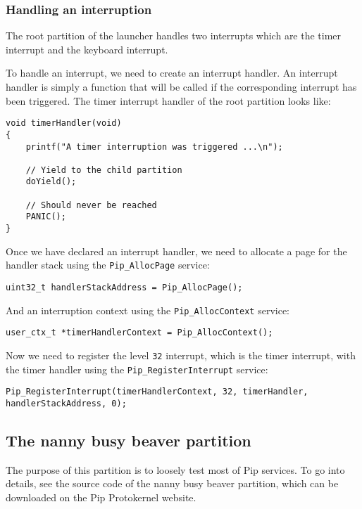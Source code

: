 \documentclass[10pt,a4paper,titlepage]{refart}
\begin{document}
\subsubsection{Handling an interruption}

The root partition of the launcher handles two interrupts which are the timer
interrupt and the keyboard interrupt.

To handle an interrupt, we need to create an interrupt handler. An interrupt
handler is simply a function that will be called if the corresponding interrupt
has been triggered. The timer interrupt handler of the root partition looks
like:

\begin{lstlisting}[style=CStyle]
void timerHandler(void)
{
	printf("A timer interruption was triggered ...\n");

	// Yield to the child partition
	doYield();

	// Should never be reached
	PANIC();
}
\end{lstlisting}

Once we have declared an interrupt handler, we need to allocate a page for the
handler stack using the \texttt{Pip\_AllocPage} service:

\begin{lstlisting}[style=CStyle]
uint32_t handlerStackAddress = Pip_AllocPage();
\end{lstlisting}

And an interruption context using the \texttt{Pip\_AllocContext} service:

\begin{lstlisting}[style=CStyle]
user_ctx_t *timerHandlerContext = Pip_AllocContext();
\end{lstlisting}

Now we need to register the level \texttt{32} interrupt, which is the timer
interrupt, with the timer handler using the \texttt{Pip\_RegisterInterrupt}
service:

\begin{lstlisting}[style=CStyle]
Pip_RegisterInterrupt(timerHandlerContext, 32, timerHandler, handlerStackAddress, 0);
\end{lstlisting}

\subsection{The nanny busy beaver partition}

The purpose of this partition is to loosely test most of Pip services. To go
into details, see the source code of the nanny busy beaver partition, which can
be downloaded on the Pip Protokernel website.
\end{document}
